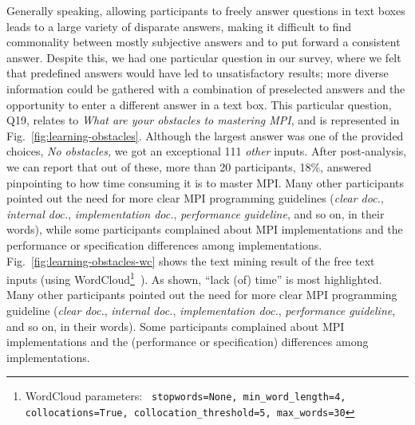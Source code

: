 \documentclass[preprint,5p,times]{elsarticle}
\def\myquote#1{{\it #1}}
\newcommand{\revision}[2]{{\color{blue}#2}}
\begin{document}
Generally speaking, allowing participants to freely answer questions in text
boxes leads to a large variety of disparate answers, making it difficult to find
commonality between mostly subjective answers and to put forward a consistent
answer. Despite this, we had one particular question in our survey, where we
felt that predefined answers would have led to unsatisfactory results;
more diverse information could be gathered with a combination of
preselected answers and the opportunity to enter a different answer in a text
box. This particular question, Q19, relates to \myquote{What are your obstacles
to mastering MPI}, and is represented in Fig.~\ref{fig:learning-obstacles}.
Although the largest answer was one of the provided choices, \myquote{No
obstacles,} we got an exceptional 111 \myquote{other} inputs.
After post-analysis, we can report that out of these,
more than 20 participants, 18\%, answered pinpointing
to how time consuming it is to master MPI. Many other
participants pointed out the need for more clear MPI programming guidelines
(\myquote{clear doc.}, \myquote{internal doc.}, \myquote{implementation doc.},
\myquote{performance guideline}, and so on, in their words), while
some participants complained
about MPI implementations and the performance or specification
differences among implementations.
\revision{}{Fig.~\ref{fig:learning-obstacles-wc} shows the text mining result of
the free text inputs
(using WordCloud\footnote{WordCloud parameters: \tt
  stopwords=None, min\_word\_length=4, collocations=True,
  collocation\_threshold=5, max\_words=30}~\cite{wordcloud}).
As shown, ``lack (of) time'' is most highlighted.}
Many other
participants pointed out the need for more clear MPI programming guideline
(\myquote{clear doc.}, \myquote{internal doc.}, \myquote{implementation doc.},
\myquote{performance guideline}, and so on, in their words). Some participants
\revision{complaints}{complained} about MPI implementations and the (performance or specification)
differences among implementations.
\end{document}

